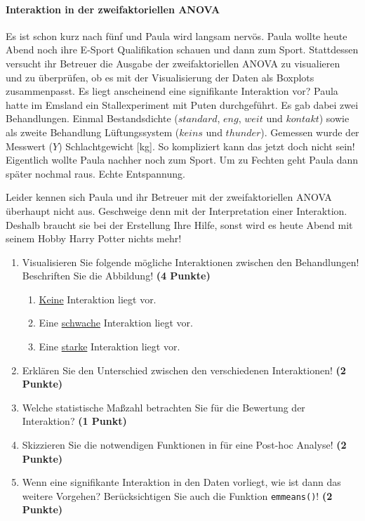 \documentclass[a4paper, 9pt]{scrartcl}\usepackage[]{graphicx}\usepackage[]{xcolor}
\begin{document}
\paragraph{Interaktion in der zweifaktoriellen ANOVA}

Es ist schon kurz nach fünf und Paula wird langsam nervös. Paula wollte heute Abend noch ihre E-Sport Qualifikation schauen und dann zum Sport. Stattdessen versucht ihr Betreuer die Ausgabe der zweifaktoriellen ANOVA zu visualieren und zu überprüfen, ob es mit der Visualisierung der Daten als Boxplots zusammenpasst. Es liegt anscheinend eine signifikante Interaktion vor? Paula hatte im Emsland ein Stallexperiment mit Puten durchgeführt. Es gab dabei zwei Behandlungen. Einmal Bestandsdichte ($standard$, $eng$, $weit$ und $kontakt$) sowie als zweite Behandlung Lüftungssystem ($keins$ und $thunder$). Gemessen wurde der Messwert ($Y$) Schlachtgewicht [kg]. So kompliziert kann das jetzt doch nicht sein! Eigentlich wollte Paula nachher noch zum Sport. Um zu Fechten geht Paula dann später nochmal raus. Echte Entspannung.

\vspace{1ex}

Leider kennen sich Paula und ihr Betreuer mit der zweifaktoriellen ANOVA überhaupt nicht aus. Geschweige denn mit der Interpretation einer Interaktion. Deshalb braucht sie bei der Erstellung Ihre Hilfe, sonst wird es heute Abend mit seinem Hobby Harry Potter nichts mehr! 

\begin{enumerate}
\item Visualisieren Sie folgende mögliche Interaktionen zwischen den Behandlungen! Beschriften Sie die Abbildung! \textbf{(4 Punkte)}
\begin{enumerate}
\item \underline{Keine} Interaktion liegt vor.
\item Eine \underline{schwache} Interaktion liegt vor. 
\item Eine \underline{starke} Interaktion liegt vor. 
\end{enumerate}
\item Erklären Sie den Unterschied zwischen den verschiedenen Interaktionen! \textbf{(2 Punkte)}
\item Welche statistische Maßzahl betrachten Sie für die Bewertung der Interaktion? \textbf{(1 Punkt)}
\item Skizzieren Sie die notwendigen Funktionen in \Rlogo für eine Post-hoc Analyse! \textbf{(2 Punkte)} 
\item Wenn eine signifikante Interaktion in den Daten vorliegt, wie ist dann das weitere Vorgehen? Berücksichtigen Sie auch die Funktion \texttt{emmeans()}! \textbf{(2 Punkte)}
\end{enumerate}
\end{document}
